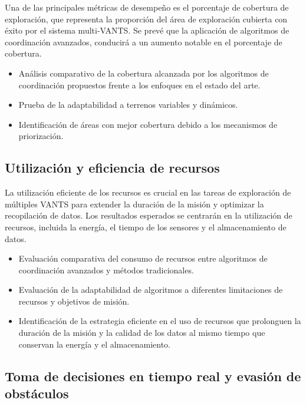 \documentclass[sigconf]{acmart}
\begin{document}
Una de las principales métricas de desempeño es el porcentaje de cobertura de exploración, que representa la proporción del área de exploración cubierta con éxito por el sistema multi-VANTS. Se prevé que la aplicación de algoritmos de coordinación avanzados, conducirá a un aumento notable en el porcentaje de cobertura.

\begin{itemize}
\item Análisis comparativo de la cobertura alcanzada por los algoritmos de coordinación propuestos frente a los enfoques en el estado del arte.
\item Prueba de la adaptabilidad a terrenos variables y dinámicos.
\item Identificación de áreas con mejor cobertura debido a los mecanismos de priorización.
\end{itemize}

\subsection*{Utilización y eficiencia de recursos}

La utilización eficiente de los recursos es crucial en las tareas de exploración de múltiples VANTS para extender la duración de la misión y optimizar la recopilación de datos. Los resultados esperados se centrarán en la utilización de recursos, incluida la energía, el tiempo de los sensores y el almacenamiento de datos.

\begin{itemize}
\item Evaluación comparativa del consumo de recursos entre algoritmos de coordinación avanzados y métodos tradicionales.

\item Evaluación de la adaptabilidad de algoritmos a diferentes limitaciones de recursos y objetivos de misión.

\item Identificación de la estrategia eficiente en el uso de recursos que prolonguen la duración de la misión y la calidad de los datos al mismo tiempo que conservan la energía y el almacenamiento.

\end{itemize}

\subsection*{Toma de decisiones en tiempo real y evasión de obstáculos}
\end{document}
